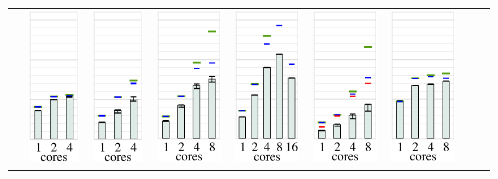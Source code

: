 \begin{tabular}{ccccccccl}
  & 
  \includegraphics[height=4.0cm,clip=true]{images/perf/p-80/p-woody-hsw-omen-rgf-tc3_5}%
  & 
  \includegraphics[height=4.0cm,clip=true]{images/perf/p-80/p-hasep1-omen-rgf-tc3_5}%
  & 
  \includegraphics[height=4.0cm,clip=true]{images/perf/p-80/p-meggie-omen-rgf-tc3_5}%
  & 
  \includegraphics[height=4.0cm,clip=true]{images/perf/p-80/p-skylakesp2-omen-rgf-tc3_5}%
  & 
  \includegraphics[height=4.0cm,clip=true]{images/perf/p-80/p-knightmare1-omen-rgf-tc3_5}%
  & 
  \includegraphics[height=4.0cm,clip=true]{images/perf/p-80/p-summitridge1-omen-rgf-tc3_5}%

\end{tabular}
